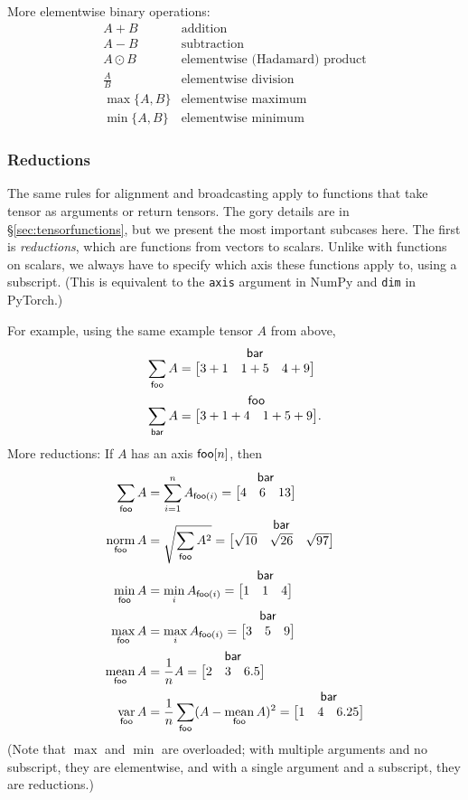 \documentclass{article}
\makeatletter
\newcommand{\nmatrix}[3]{\name{#1}\begin{array}[b]{@{}c@{}}\name{#2}\\\begin{bmatrix}#3\end{bmatrix}\end{array}}
\makeatother
\begin{document}
More elementwise binary operations:
\[\begin{array}{cl}
A+B & \text{addition} \\
A-B & \text{subtraction} \\
A\odot B & \text{elementwise (Hadamard) product} \\
\displaystyle\frac{A}{B} & \text{elementwise division} \\[1.2ex]
\max \{A, B\} & \text{elementwise maximum} \\
\min \{A, B\} & \text{elementwise minimum}
\end{array}\]

\subsubsection{Reductions}

The same rules for alignment and broadcasting apply to functions that take tensor as arguments or return tensors. The gory details are in \S\ref{sec:tensorfunctions}, but we present the most important subcases here. The first is \emph{reductions}, which are functions from vectors to scalars. Unlike with functions on scalars, we always have to specify which axis these functions apply to, using a subscript. (This is equivalent to the \verb|axis| argument in NumPy and \verb|dim| in PyTorch.)

For example, using the same example tensor $A$ from above,
\begin{align*}
\nsum{foo} A &= \nmatrix{}{bar}{
  3+1 & 1+5 & 4+9
} \\
\nsum{bar} A &= \nmatrix{}{foo}{
  3+1+4 & 1+5+9
}.
\end{align*}
More reductions: If $A$ has an axis $\mathsf{foo}[n]$, then
\begin{align*}
  \nsum{foo} A &= \sum_{i=1}^n A_{\nidx{foo}{i}} = \nmatrix{}{bar}{4 & 6 & 13} \\
  \nfun{foo}{norm} A &= \sqrt{\nsum{foo} A^2} = \nmatrix{}{bar}{\sqrt{10} & \sqrt{26} & \sqrt{97}} \\
  \nfun{foo}{min} A &= \min_{i} A_{\nidx{foo}{i}} = \nmatrix{}{bar}{1 & 1 & 4} \\
  \nfun{foo}{max} A &= \max_{i} A_{\nidx{foo}{i}} = \nmatrix{}{bar}{3 & 5 & 9} \\
  \nfun{foo}{mean} A &= \frac{1}{n} A = \nmatrix{}{bar}{2 & 3 & 6.5} \\
  \nfun{foo}{var} A &= \frac{1}{n} \nsum{foo} (A - \nfun{foo}{mean} A)^2 = \nmatrix{}{bar}{1 & 4 & 6.25}
\end{align*}
(Note that $\max$ and $\min$ are overloaded; with multiple arguments and no subscript, they are elementwise, and with a single argument and a subscript, they are reductions.)
\end{document}
